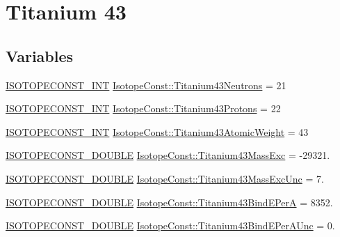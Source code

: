 \hypertarget{group___isotope_const-_titanium-_ti43}{}\section{Titanium 43}
\label{group___isotope_const-_titanium-_ti43}
\subsection*{Variables}
\begin{DoxyCompactItemize}
\item 
\mbox{\hyperlink{group___isotope_const-_macros_ga5f18360b3e99483a35c32d789e62621c}{I\+S\+O\+T\+O\+P\+E\+C\+O\+N\+S\+T\+\_\+\+I\+NT}} \mbox{\hyperlink{group___isotope_const-_titanium-_ti43_ga91df927c56abd72364ba5c3fc37be4a6}{Isotope\+Const\+::\+Titanium43\+Neutrons}} = 21
\item 
\mbox{\hyperlink{group___isotope_const-_macros_ga5f18360b3e99483a35c32d789e62621c}{I\+S\+O\+T\+O\+P\+E\+C\+O\+N\+S\+T\+\_\+\+I\+NT}} \mbox{\hyperlink{group___isotope_const-_titanium-_ti43_ga46e1609a1fa23f30b9dc2b887ee11adc}{Isotope\+Const\+::\+Titanium43\+Protons}} = 22
\item 
\mbox{\hyperlink{group___isotope_const-_macros_ga5f18360b3e99483a35c32d789e62621c}{I\+S\+O\+T\+O\+P\+E\+C\+O\+N\+S\+T\+\_\+\+I\+NT}} \mbox{\hyperlink{group___isotope_const-_titanium-_ti43_gad2b3a6982f74c04ffe04122868461839}{Isotope\+Const\+::\+Titanium43\+Atomic\+Weight}} = 43
\item 
\mbox{\hyperlink{group___isotope_const-_macros_ga8f45a7272ce02c0b4c65c44636ed719a}{I\+S\+O\+T\+O\+P\+E\+C\+O\+N\+S\+T\+\_\+\+D\+O\+U\+B\+LE}} \mbox{\hyperlink{group___isotope_const-_titanium-_ti43_gabaf6e3f078e3419edc2eb802995b0c6d}{Isotope\+Const\+::\+Titanium43\+Mass\+Exc}} = -\/29321.
\item 
\mbox{\hyperlink{group___isotope_const-_macros_ga8f45a7272ce02c0b4c65c44636ed719a}{I\+S\+O\+T\+O\+P\+E\+C\+O\+N\+S\+T\+\_\+\+D\+O\+U\+B\+LE}} \mbox{\hyperlink{group___isotope_const-_titanium-_ti43_ga6ae34cc8dd57c8aa9d248427a56d3daa}{Isotope\+Const\+::\+Titanium43\+Mass\+Exc\+Unc}} = 7.
\item 
\mbox{\hyperlink{group___isotope_const-_macros_ga8f45a7272ce02c0b4c65c44636ed719a}{I\+S\+O\+T\+O\+P\+E\+C\+O\+N\+S\+T\+\_\+\+D\+O\+U\+B\+LE}} \mbox{\hyperlink{group___isotope_const-_titanium-_ti43_ga397ca62c38fdae5feee0cb92b9cb7361}{Isotope\+Const\+::\+Titanium43\+Bind\+E\+PerA}} = 8352.
\item 
\mbox{\hyperlink{group___isotope_const-_macros_ga8f45a7272ce02c0b4c65c44636ed719a}{I\+S\+O\+T\+O\+P\+E\+C\+O\+N\+S\+T\+\_\+\+D\+O\+U\+B\+LE}} \mbox{\hyperlink{group___isotope_const-_titanium-_ti43_ga2740a5138b28373415b3a2332bcf5ebc}{Isotope\+Const\+::\+Titanium43\+Bind\+E\+Per\+A\+Unc}} = 0.

\end{DoxyCompactItemize}
